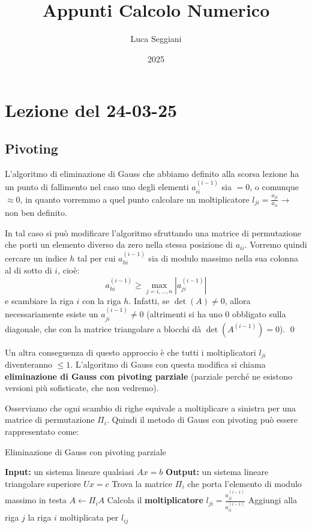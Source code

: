 \documentclass[a4paper,11pt]{article}
\title{Appunti Calcolo Numerico}
\author{Luca Seggiani}
\date{2025}
\begin{document}
\section{Lezione del 24-03-25}

\thispagestyle{empty}
\pagestyle{fancy}

\subsection{Pivoting}
L'algoritmo di eliminazione di Gauss che abbiamo definito alla scorsa lezione ha un punto di fallimento nel caso uno degli elementi $a_{ii}^{(i - 1)}$ sia $= 0$, o comunque $\approx 0$, in quanto vorremmo a quel punto calcolare un moltiplicatore $l_{ji} = \frac{a_{ji}}{a_{ii}} \rightarrow$ non ben definito.

In tal caso si può modificare l'algoritmo sfruttando una matrice di permutazione che porti un elemento diverso da zero nella stessa posizione di $a_{ii}$.
Vorremo quindi cercare un indice $h$ tal per cui $a_{hi}^{(i - 1)}$ sia di modulo massimo nella sua colonna al di sotto di $i$, cioè:
$$
a_{hi}^{(i - 1)} \geq \max_{j = i, ..., n} | a_{ji}^{(i - 1)} |
$$
e scambiare la riga $i$ con la riga $h$.
Infatti, se $\det(A) \neq 0$, allora necessariamente esiste un $a_{ji}^{(i - 1)} \neq 0$ (altrimenti si ha uno 0 obbligato sulla diagonale, che con la matrice triangolare a blocchi dà $\det(A^{(i - 1)}) = 0$). \qed

Un altra conseguenza di questo approccio è che tutti i moltiplicatori $l_{ji}$ diventeranno $\leq 1$.
L'algoritmo di Gauss con questa modifica si chiama \textbf{eliminazione di Gauss con pivoting parziale} (parziale perché ne esistono versioni più sofisticate, che non vedremo).

Osserviamo che ogni scambio di righe equivale a moltiplicare a sinistra per una matrice di permutazione $\Pi_i$.
Quindi il metodo di Gauss con pivoting può essere rappresentato come:
\begin{algorithm}
\caption{Eliminazione di Gauss con pivoting parziale}
\begin{algorithmic}
	\STATE \textbf{Input:} un sistema lineare qualsiasi $Ax = b$ %
	\STATE \textbf{Output:} un sistema lineare triangolare superiore $Ux = c$ %
		\STATE Trova la matrice $\Pi_i$ che porta l'elemento di modulo massimo in testa
		\STATE $A \leftarrow \Pi_i A$
			\STATE Calcola il \textbf{moltiplicatore} $l_{ji} = \frac{a_{ji}^{(i - 1)}}{a_{ii}^{(i - 1)}}$
			\STATE Aggiungi alla riga $j$ la riga $i$ moltiplicata per $l_{ij}$
		\ENDFOR
	\ENDFOR
\end{algorithmic}
\end{algorithm}
\end{document}
